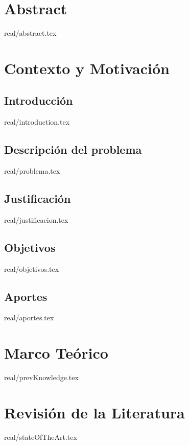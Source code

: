 \documentclass{report}
\begin{document}
\chapter*{Abstract}
{real/abstract.tex}

\tableofcontents

\chapter{Contexto y Motivación}

\section{Introducción}
{real/introduction.tex}

\section{Descripción del problema}
{real/problema.tex}

\section{Justificación}
{real/justificacion.tex}

\section{Objetivos}
{real/objetivos.tex}

\section{Aportes}
{real/aportes.tex}



\chapter{Marco Teórico}
{real/prevKnowledge.tex}

\chapter{Revisión de la Literatura}
{real/stateOfTheArt.tex}
\end{document}
